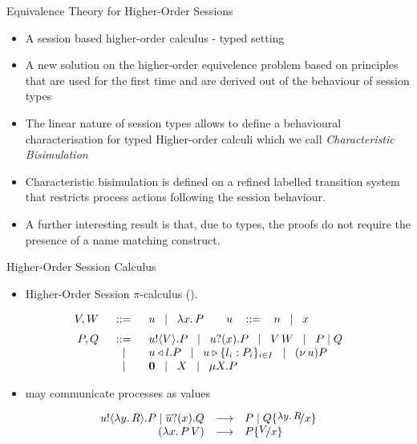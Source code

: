 \documentclass{beamer}
\begin{document}
	\begin{frame}{Equivalence Theory for Higher-Order Sessions}
		\begin{itemize}
			\item	A session based higher-order calculus - typed setting

			\item	A new solution on the higher-order equivelence problem based
				on principles that are
				used for the first time and are derived out of the behaviour of session types

			\item	The linear nature of session types allows to define
				a behavioural characterisation for typed Higher-order calculi
				which we call {\em Characteristic Bisimulation}

			\item	Characteristic bisimulation is defined on a refined labelled transition system
				that restricts process actions following the session behaviour.

			\item	A further interesting result is that, due to types, the proofs do
				not require the presence of a name matching construct.
		\end{itemize}
	\end{frame}

	\begin{frame}{Higher-Order Session Calculus}
		\begin{itemize}
			\item	Higher-Order Session $\pi$-calculus (\HOp).
		\end{itemize}

		\[
		\begin{array}{rcl}
			V, W &\bnfis& u \bnfbar \abs{x} P \qquad u\ \bnfis\ n \bnfbar x \\[2mm]
			P, Q &\bnfis& \bout{u}{V} P \bnfbar \binp{u}{x} P \bnfbar \appl{V}{W} \bnfbar P \Par Q \\
			&\bnfbar& \bsel{u}{l} P \bnfbar \bbra{u}{l_i: P_i}_{i \in I} \bnfbar \news{u} P \\
			&\bnfbar& \inact \bnfbar \varp{X} \bnfbar \recp{X}{P}
		\end{array}
		\]

		\begin{itemize}
			\item	\HOp may communicate processes as values
		\end{itemize}

		\[
			\begin{array}{rcl}
				\bout{u}{\abs{y}{R}} P \Par \binp{\dual{u}}{x} Q &\red& P \Par Q \subst{\abs{y}{R}}{x}\\
				(\appl{\abs{x}{P}}{V}) &\red& P \subst{V}{x}
			\end{array}
		\]
	\end{frame}
\end{document}
